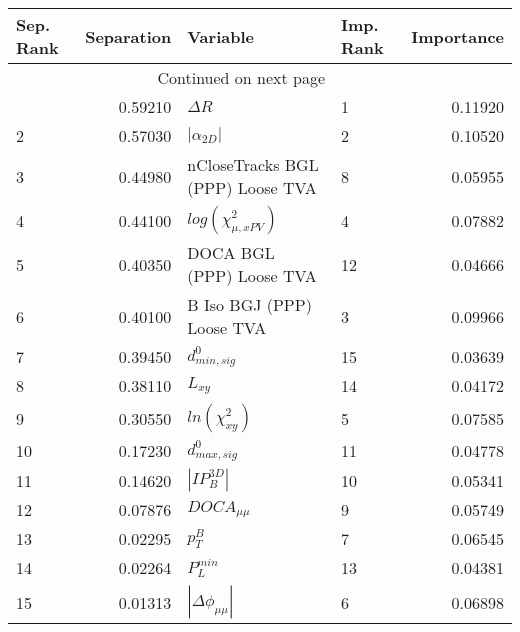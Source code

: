 \usepackage{lscape}

\begin{landscape}
\begin{longtable}{lrllr}
\toprule
Sep. Rank &  Separation &                          Variable & Imp. Rank &  Importance \\
\midrule
\endhead
\midrule
\multicolumn{3}{r}{{Continued on next page}} \\
\midrule
\endfoot

\bottomrule
\endlastfoot
        1 &     0.59210 &                        $\Delta R$ &         1 &     0.11920 \\
        2 &     0.57030 &                   $|\alpha_{2D}|$ &         2 &     0.10520 \\
        3 &     0.44980 &  nCloseTracks BGL (PPP) Loose TVA &         8 &     0.05955 \\
        4 &     0.44100 &         $log(\chi^{2}_{\mu,xPV})$ &         4 &     0.07882 \\
        5 &     0.40350 &          DOCA BGL (PPP) Loose TVA &        12 &     0.04666 \\
        6 &     0.40100 &         B Iso BGJ (PPP) Loose TVA &         3 &     0.09966 \\
        7 &     0.39450 &                  $d^0_{min, sig}$ &        15 &     0.03639 \\
        8 &     0.38110 &                          $L_{xy}$ &        14 &     0.04172 \\
        9 &     0.30550 &               $ln(\chi^{2}_{xy})$ &         5 &     0.07585 \\
       10 &     0.17230 &                  $d^0_{max, sig}$ &        11 &     0.04778 \\
       11 &     0.14620 &                   $|IP_{B}^{3D}|$ &        10 &     0.05341 \\
       12 &     0.07876 &                   $DOCA_{\mu\mu}$ &         9 &     0.05749 \\
       13 &     0.02295 &                         $p^B_{T}$ &         7 &     0.06545 \\
       14 &     0.02264 &                     $P^{min}_{L}$ &        13 &     0.04381 \\
       15 &     0.01313 &          $|\Delta \phi_{\mu\mu}|$ &         6 &     0.06898 \\
\end{longtable}

\end{landscape}

